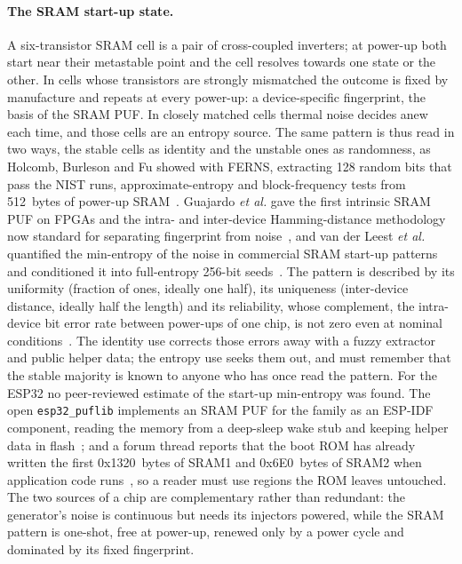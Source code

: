 \paragraph{The SRAM start-up state.} A six-transistor SRAM cell is a pair
of cross-coupled inverters; at power-up both start near their metastable
point and the cell resolves towards one state or the other. In cells whose
transistors are strongly mismatched the outcome is fixed by manufacture and
repeats at every power-up: a device-specific fingerprint, the basis of the
SRAM PUF. In closely matched cells thermal noise decides anew each time,
and those cells are an entropy source. The same pattern is thus read in two
ways, the stable cells as identity and the unstable ones as randomness, as
Holcomb, Burleson and Fu showed with FERNS, extracting 128 random bits that
pass the NIST runs, approximate-entropy and block-frequency tests from
512~bytes of power-up SRAM~\cite{holcomb_2009_powerup}. Guajardo \emph{et
al.} gave the first intrinsic SRAM PUF on FPGAs and the intra- and
inter-device Hamming-distance methodology now standard for separating
fingerprint from noise~\cite{guajardo_2007_fpga}, and van der Leest
\emph{et al.} quantified the min-entropy of the noise in commercial SRAM
start-up patterns and conditioned it into full-entropy 256-bit
seeds~\cite{vanderleest_2012_efficient}. The pattern is described by its
uniformity (fraction of ones, ideally one half), its uniqueness
(inter-device distance, ideally half the length) and its reliability, whose
complement, the intra-device bit error rate between power-ups of one chip,
is not zero even at nominal
conditions~\cite{holcomb_2009_powerup, vanderleest_2012_efficient}. The
identity use corrects those errors away with a fuzzy extractor and public
helper data; the entropy use seeks them out, and must remember that the
stable majority is known to anyone who has once read the pattern. For the
ESP32 no peer-reviewed estimate of the start-up min-entropy was found. The
open \texttt{esp32\_\allowbreak{}puflib} implements an SRAM PUF for the family as an
ESP-IDF component, reading the memory from a deep-sleep wake stub and
keeping helper data in flash~\cite{stanicek_esp32_puflib}; and a forum
thread reports that the boot ROM has already written the first 0x1320~bytes
of SRAM1 and 0x6E0~bytes of SRAM2 when application code
runs~\cite{esp32forum_wakestub}, so a reader must use regions the ROM
leaves untouched. The two sources of a chip are complementary rather than
redundant: the generator's noise is continuous but needs its injectors
powered, while the SRAM pattern is one-shot, free at power-up, renewed only
by a power cycle and dominated by its fixed fingerprint.

